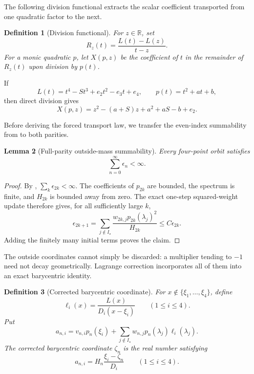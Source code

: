 \documentclass[11pt]{article}
\newtheorem{lemma}{Lemma}[section]
\newtheorem{definition}[lemma]{Definition}
\begin{document}
The following division functional extracts the scalar coefficient transported
from one quadratic factor to the next.

\begin{definition}[Division functional]
\label{def:division-functional}
For \(z\in\mathbb R\), set
\[
 R_z(t)=\frac{L(t)-L(z)}{t-z}.
\]
For a monic quadratic \(p\), let \(X(p,z)\) be the coefficient of \(t\)
in the remainder of \(R_z(t)\) upon division by \(p(t)\).
\end{definition}

If
\[
 L(t)=t^4-St^3+e_2t^2-e_3t+e_4,\qquad
 p(t)=t^2+at+b,
\]
then direct division gives
\[
 X(p,z)=z^2-(a+S)z+a^2+aS-b+e_2.
\tag{16}\label{eq:division-functional-formula}
\]

Before deriving the forced transport law, we transfer the even-index
summability from  to both parities.

\begin{lemma}[Full-parity outside-mass summability]
\label{lem:outside-mass-all-parities}
Every four-point orbit satisfies
\[
 \sum_{n=0}^{\infty}\epsilon_n<\infty.
\tag{17}\label{eq:outside-mass-summable}
\]
\end{lemma}

\begin{proof}
By ,
\(\sum_k\epsilon_{2k}<\infty\).  The coefficients of \(p_{2k}\) are
bounded, the spectrum is finite, and \(H_{2k}\) is bounded away from zero.
The exact one-step squared-weight update therefore gives, for all
sufficiently large \(k\),
\[
 \epsilon_{2k+1}
 =\sum_{j\notin I_\star}
   \frac{w_{2k,j}p_{2k}(\lambda_j)^2}{H_{2k}}
 \leq C\epsilon_{2k}.
\]
Adding the finitely many initial terms proves the claim.
\end{proof}

The outside coordinates cannot simply be discarded: a multiplier tending
to \(-1\) need not decay geometrically.  Lagrange correction incorporates
all of them into an exact barycentric identity.

\begin{definition}[Corrected barycentric coordinate]
\label{def:corrected-barycentric}
For \(x\notin\{\xi_1,\ldots,\xi_4\}\), define
\[
 \ell_i(x)=\frac{L(x)}{D_i(x-\xi_i)}
 \qquad(1\leq i\leq4).
\]
Put
\[
 a_{n,i}=v_{n,i}p_n(\xi_i)
 +\sum_{j\notin I_\star}
       w_{n,j}p_n(\lambda_j)\ell_i(\lambda_j).
\]
The corrected barycentric coordinate \(\zeta_n\) is the real number
satisfying
\[
 a_{n,i}=H_n\frac{\xi_i-\zeta_n}{D_i}
 \qquad(1\leq i\leq4).
\tag{18}\label{eq:corrected-barycentric}
\]
\end{definition}
\end{document}
